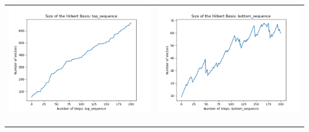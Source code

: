 \documentclass[10pt]{article}
\begin{document}
\begin{tabular}{c|c}
\begin{minipage}{.4\textwidth}
\includegraphics[width=\textwidth]{"DATA/5d/6 generators 2 bound C/top_sequence SIZE"}
\end{minipage} &
\begin{minipage}{.4\textwidth}
\includegraphics[width=\textwidth]{"DATA/5d/6 generators 2 bound C bottomup/bottom_sequence SIZE"}
\end{minipage} \\ \\
\hline \\\begin{minipage}{.4\textwidth}

\end{minipage}
\end{tabular}
\end{document}
